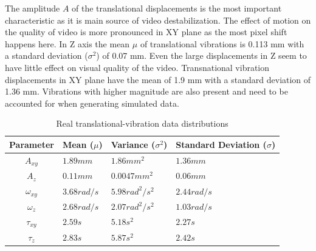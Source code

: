 The amplitude $ A $ of the translational displacements is the most important characteristic as it is main source of video destabilization. The effect of motion on the quality of video is more pronounced in XY plane as the most pixel shift happens here. In Z axis the mean $ \mu $ of translational vibrations is 0.113 mm with a standard deviation ($ \sigma^{2} $) of 0.07 mm. Even the large displacements in Z seem to have little effect on visual quality of the video. Transnational vibration displacements in XY plane have the mean of 1.9 mm with a standard deviation of 1.36 mm. Vibrations with higher magnitude are also present and need to be accounted for when generating simulated data.

\begin{table}[H]
    \centering
\begin{tabular}{ c | L | L | L }
    
     Parameter  & 
     Mean ($ \mu $) & 
     Variance ($ \sigma^{2} $) &
     Standard Deviation ($ \sigma $)\\
     \hline
     
     $ A_{xy} $ & 
     $ 1.89 mm $ & 
     $ 1.86 mm^{2} $ &
     $ 1.36 mm $ \\

      
     $ A_{z} $  & 
     $ 0.11 mm $ & 
     $ 0.0047 mm^{2} $ &
     $ 0.06 mm $ \\
     
     
     $ \omega_{xy} $ & 
     $ 3.68 rad/s $ & 
     $ 5.98 rad^{2}/s^{2} $ &
     $ 2.44 rad/s $ \\
     
     
     $ \omega_{z} $& 
     $ 2.68 rad/s $ & 
     $ 2.07 rad^{2}/s^{2} $ &
     $ 1.03 rad/s $ \\

     
     $ \tau_{xy} $ & 
     $ 2.59 s $ & 
     $ 5.18 s^{2} $ &
     $ 2.27 s $ \\


     $ \tau_{z} $ & 
     $ 2.83 s $ & 
     $ 5.87 s^{2} $ &
     $ 2.42 s $ \\

\end{tabular}
    \caption{Real translational-vibration data distributions}
    \label{tab:real_data_analysis_displacement}
\end{table}

